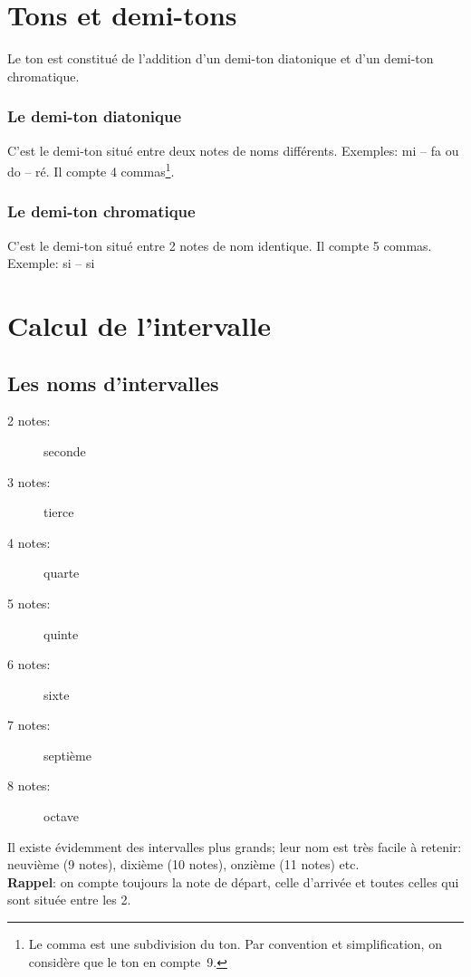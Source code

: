 \section{Tons et demi-tons}
Le ton est constitué de l'addition d'un demi-ton diatonique et d'un demi-ton chromatique.
\subsubsection{Le demi-ton diatonique}
C'est le demi-ton situé entre deux notes de noms différents. Exemples: mi -- fa ou do \sharp{} -- ré. Il compte 4 commas\footnote{Le comma est une subdivision du ton. Par convention et simplification, on considère que le ton en compte~9.}.
\subsubsection{Le demi-ton chromatique}
C'est le demi-ton situé entre 2 notes de nom identique. Il compte 5 commas. Exemple: si -- si \flat

\section{Calcul de l'intervalle}

\subsection{Les noms d'intervalles}
\begin{description}
\item [2 notes:] seconde
\item [3 notes:] tierce
\item [4 notes:] quarte
\item [5 notes:] quinte
\item [6 notes:] sixte
\item [7 notes:] septième
\item [8 notes:] octave
\end{description}
Il existe évidemment des intervalles plus grands; leur nom est très facile à retenir: neuvième (9 notes), dixième (10 notes), onzième (11 notes) etc.\\

\textbf{Rappel}: on compte toujours la note de départ, celle d'arrivée et toutes celles qui sont située entre les 2.

